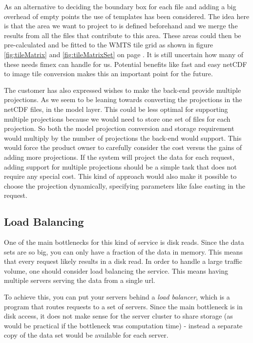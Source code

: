 \documentclass[11pt,a4paper,titlepage,oneside]{report}
\begin{document}
As an alternative to deciding the boundary box for each file and adding a big overhead of empty points the use of templates has been considered. The idea here is that the area we want to project to is defined beforehand and we merge the results from all the files that contribute to this area. These areas could then be pre-calculated and be fitted to the \gls{WMTS} tile grid as shown in figure \ref{fig:tileMatrix} and \ref{fig:tileMatrixSet} on page \pageref{fig:tileMatrixSet}. It is still uncertain how many of these needs fimex can handle for us. Potential benefits like fast and easy netCDF to image tile conversion makes this an important point for the future.

The customer has also expressed wishes to make the back-end provide multiple projections. As we seem to be leaning towards converting the projections in the netCDF files, in the model layer. This could be less optimal for supporting multiple projections because we would need to store one set of files for each projection. So both the model projection conversion and storage requirement would multiply by the number of projections the \gls{back-end} would support. This would force the product owner to carefully consider the cost versus the gains of adding more projections. 
If the system will project the data for each request, adding support for multiple projections should be a simple task that does not require any special cost. This kind of approach would also make it possible to choose the projection dynamically, specifying parameters like false easting in the request.

\subsection{Load Balancing}
One of the main bottlenecks for this kind of service is disk reads. Since the data sets are so big, you can only have a fraction of the data in memory. This means that every request likely results in a disk read. 
In order to handle a large traffic volume, one should consider load balancing the service. This means having multiple servers serving the data from a single url.

To achieve this, you can put your servers behind a \textit{load balancer}, which is a program that routes requests to a set of servers. Since the main bottleneck is in disk access, it does not make sense for the server cluster to share storage (as would be practical if the bottleneck was computation time) - instead a separate copy of the data set would be available for each server.
\end{document}
